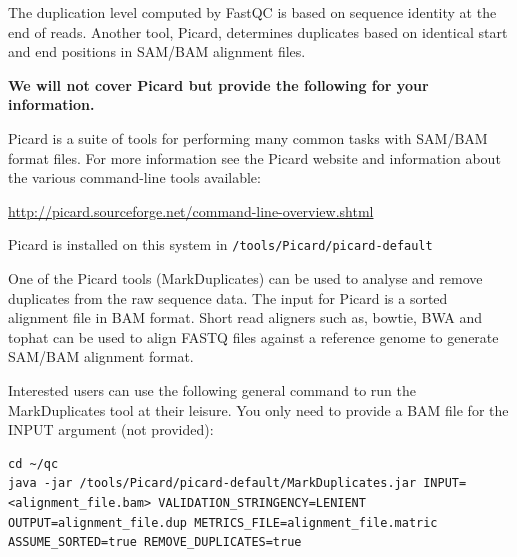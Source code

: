 \begin{advanced}
\begin{information}
The duplication level computed by FastQC is based on sequence identity at the
end of reads. Another tool, Picard, determines duplicates based on identical
start and end positions in SAM/BAM alignment files.

\textbf{We will not cover Picard but
provide the following for your information.}

Picard is a suite of tools for performing many common tasks with SAM/BAM format
files. For more information see the Picard website and information about the
various command-line tools available:

\url{http://picard.sourceforge.net/command-line-overview.shtml}
\end{information}

\begin{information}
Picard is installed on this system in \texttt{/tools/Picard/picard-default}

One of the Picard tools (MarkDuplicates) can be used to analyse and remove
duplicates from the raw sequence data. The input for Picard is a sorted
alignment file in BAM format. Short read aligners such as, bowtie, BWA and tophat
can be used to align FASTQ files against a reference genome to generate
SAM/BAM alignment format.
\end{information}

\begin{steps}
Interested users can use the following general command to run the
MarkDuplicates tool at their leisure. You only need to provide a BAM file for the
INPUT argument (not provided):


\begin{lstlisting}[style=command_syntax]
cd ~/qc
java -jar /tools/Picard/picard-default/MarkDuplicates.jar INPUT=<alignment_file.bam> VALIDATION_STRINGENCY=LENIENT OUTPUT=alignment_file.dup METRICS_FILE=alignment_file.matric ASSUME_SORTED=true REMOVE_DUPLICATES=true

\end{lstlisting}
\end{steps}

\end{advanced}

